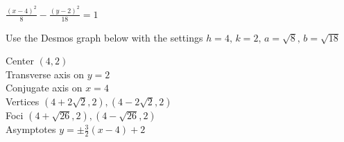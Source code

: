 \documentclass{ximera}
\begin{document}
\begin{question}
\begin{problem}
\end{problem}

\begin{problem}\label{graphhyperbolalast}
    $\frac{(x-4)^2}{8} - \frac{(y-2)^2}{18} = 1$ 

\begin{solution}
Use the Desmos graph below with the settings $h=4,\,k=2,\,a=\sqrt{8},\,b=\sqrt{18}$

\begin{center} 
\end{center}
Center $(4, 2)$\\
Transverse axis on $y=2$\\
Conjugate axis on $x=4$\\
Vertices $\left(4+2\sqrt{2},2\right), \left(4-2\sqrt{2},2\right)$\\
Foci $\left(4+\sqrt{26},2 \right), \left(4-\sqrt{26},2\right)$\\
Asymptotes $y = \pm \frac{3}{2} (x-4)+2$\\
\end{solution}
    
\end{problem}

\end{question}
\end{document}
